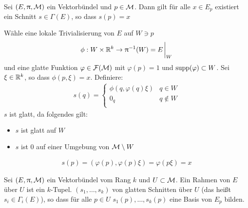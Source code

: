 \begin{lem}
Sei $(E, \uppi, \mathcal{M})$ ein Vektorbündel und $p \in \mathcal{M}$.
Dann gilt für alle $x \in E_p$ existiert ein Schnitt $s \in \Gamma (E)$, so dass $s(p)=x$
\end{lem}
\begin{bew}
Wähle eine lokale Trivialisierung von $E$ auf $W \ni p$
\begin{align}
\phi: W \times \R^k \to \pi^{-1}(W) = E\eval_W
\end{align}
und eine glatte Funktion $\varphi \in \mathcal{F}(\mathcal{M})$ mit $\varphi(p)=1$ und $\operatorname{supp}(\varphi) \subset W$.
Sei $\xi \in \mathbb{R}^k$, so dass $\phi (p, \xi)=x$.
Definiere:
\begin{align}
s(q) = \left\{
\begin{array}{ll}
\phi(q, \varphi(q)\xi) & q\in W \\
0_q & q \not\in W \\
\end{array}
\right.
\end{align}
$s$ ist glatt, da folgendes gilt:
\begin{itemize}
\item $s$ ist glatt auf $W$
\item $s$ ist $0$ auf einer Umgebung von $\mathcal{M} \setminus W$
\end{itemize}
\begin{align}
s(p) = ( \varphi(p), \varphi(p) \xi ) = \varphi (p \xi) = x
\end{align}
\end{bew}

\begin{defs}
Sei $(E, \uppi, \mathcal{M})$ ein Vektorbündel vom Rang $k$ und $U \subset \mathcal{M}$.
Ein Rahmen von $E$ über $U$ ist ein $k$-Tupel.
$(s_1, \dots, s_k)$ von glatten Schnitten über $U$ (das heißt $s_i \in \Gamma_i (E)$), so dass für alle $p \in U$
$s_1 (p), \dots, s_k (p)$ eine Basis von $E_p$ bilden.
\end{defs}
